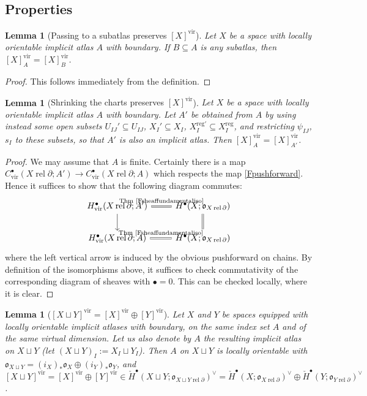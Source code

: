 \documentclass[12pt]{article}
\newtheorem{lemma}[theorem]{Lemma}
\theoremstyle{definition}
\theoremstyle{remark}
\numberwithin{equation}{subsection}
\newcommand{\oo}{\mathfrak o}
\newcommand{\cH}{\check H}
\newcommand{\vir}{\mathrm{vir}}
\newcommand{\reg}{\mathrm{reg}}
\newcommand{\rel}{\operatorname{rel}}
\begin{document}
\subsection{Properties}\label{fclassproperties}

\begin{lemma}[{Passing to a subatlas preserves $[X]^\vir$}]\label{sameassubatlas}
Let $X$ be a space with locally orientable implicit atlas $A$ with boundary.  If $B\subseteq A$ is any subatlas, then $[X]^\vir_A=[X]^\vir_B$.
\end{lemma}

\begin{proof}
This follows immediately from the definition.
\end{proof}

\begin{lemma}[{Shrinking the charts preserves $[X]^\vir$}]\label{openreduction}
Let $X$ be a space with locally orientable implicit atlas $A$ with boundary.  Let $A'$ be obtained from $A$ by using instead some open subsets $U_{IJ}'\subseteq U_{IJ}$, $X_I'\subseteq X_I$, $X_I^{\reg\prime}\subseteq X_I^\reg$, and restricting $\psi_{IJ}$, $s_I$ to these subsets, so that $A'$ is also an implicit atlas.  Then $[X]^\vir_A=[X]^\vir_{A'}$.
\end{lemma}

\begin{proof}
We may assume that $A$ is finite.  Certainly there is a map $C^\bullet_\vir(X\rel\partial;A')\to C^\bullet_\vir(X\rel\partial;A)$ which respects the map \eqref{Fpushforward}.  Hence it suffices to show that the following diagram commutes:
\begin{equation}
\begin{tikzcd}
H^\bullet_\vir(X\rel\partial;A')\ar{d}\ar[equal]{r}{\text{Thm \ref{Fsheaffundamentaliso}}}&\cH^\bullet(X;\oo_{X\rel\partial})\ar[equal]{d}\\
H^\bullet_\vir(X\rel\partial;A)\ar[equal]{r}{\text{Thm \ref{Fsheaffundamentaliso}}}&\cH^\bullet(X;\oo_{X\rel\partial})
\end{tikzcd}
\end{equation}
where the left vertical arrow is induced by the obvious pushforward on chains.  By definition of the isomorphisms above, it suffices to check commutativity of the corresponding diagram of sheaves with $\bullet=0$.  This can be checked locally, where it is clear.
\end{proof}

\begin{lemma}[{$[X\sqcup Y]^\vir=[X]^\vir\oplus[Y]^\vir$}]\label{disjointunionfc}
Let $X$ and $Y$ be spaces equipped with locally orientable implicit atlases with boundary, on the same index set $A$ and of the same virtual dimension.  Let us also denote by $A$ the resulting implicit atlas on $X\sqcup Y$ (let $(X\sqcup Y)_I:=X_I\sqcup Y_I$).  Then $A$ on $X\sqcup Y$ is locally orientable with $\oo_{X\sqcup Y}=(i_X)_\ast\oo_X\oplus(i_Y)_\ast\oo_Y$, and $[X\sqcup Y]^\vir=[X]^\vir\oplus[Y]^\vir\in\cH^\bullet(X\sqcup Y;\oo_{X\sqcup Y\rel\partial})^\vee=\cH^\bullet(X;\oo_{X\rel\partial})^\vee\oplus\cH^\bullet(Y;\oo_{Y\rel\partial})^\vee$.
\end{lemma}
\end{document}
